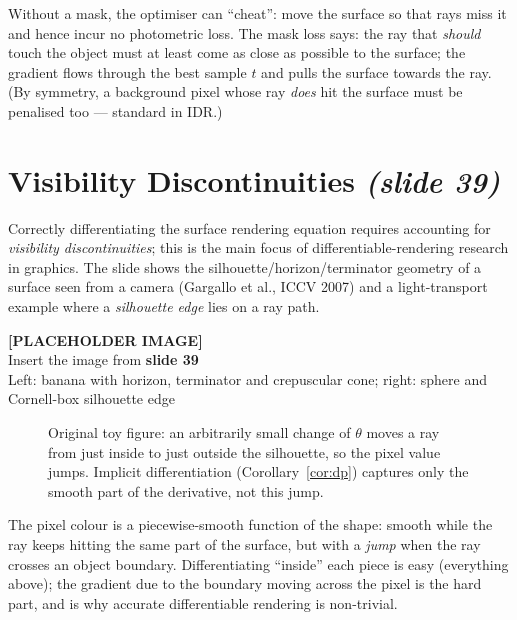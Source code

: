 \documentclass[11pt,a4paper]{article}
\newcommand{\slideimg}[2]{%
  \begin{center}
  \begin{tcolorbox}[enhanced,colback=gray!8,colframe=gray!8,width=0.92\linewidth,
    halign=center,valign=center,height=3.4cm,
    overlay={\draw[dashed,gray!70,thick] (frame.south west) rectangle (frame.north east);}]
  \textbf{[PLACEHOLDER IMAGE]}\\ Insert the image from \textbf{#1}\\ {\small #2}
  \end{tcolorbox}
  \end{center}}
\begin{document}
\begin{intuition}
Without a mask, the optimiser can ``cheat'': move the surface so that rays miss it and hence incur no photometric loss.
The mask loss says: the ray that \emph{should} touch the object must at least come as close as possible to the surface;
the gradient flows through the best sample $t$ and pulls the surface towards the ray. (By symmetry, a background
pixel whose ray \emph{does} hit the surface must be penalised too --- standard in IDR.)
\end{intuition}

\section{Visibility Discontinuities \emph{(slide 39)}}
Correctly differentiating the surface rendering equation requires accounting for \emph{visibility discontinuities}; this is
the main focus of differentiable-rendering research in graphics. The slide shows the silhouette/horizon/terminator
geometry of a surface seen from a camera (Gargallo et al., ICCV 2007) and a light-transport example where a
\emph{silhouette edge} lies on a ray path.

\slideimg{slide 39}{Left: banana with horizon, terminator and crepuscular cone; right: sphere and Cornell-box silhouette edge}

\begin{figure}[htbp]
\centering
{}
\caption{Original toy figure: an arbitrarily small change of $\theta$ moves a ray from just inside to just outside the silhouette,
so the pixel value jumps. Implicit differentiation (Corollary~\ref{cor:dp}) captures only the smooth part of the derivative, not this jump.}
\end{figure}

\begin{intuition}
The pixel colour is a piecewise-smooth function of the shape: smooth while the ray keeps hitting the same
part of the surface, but with a \emph{jump} when the ray crosses an object boundary. Differentiating ``inside'' each piece is
easy (everything above); the gradient due to the boundary moving across the pixel is the hard part, and is why
accurate differentiable rendering is non-trivial.
\end{intuition}
\end{document}
